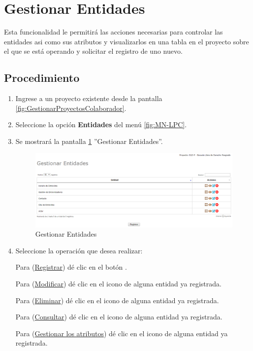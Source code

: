 \hypertarget{cv:gestionarEntidades}{\section{Gestionar Entidades}} \label{sec:GestionarEntidades}

	Esta funcionalidad le permitirá las acciones necesarias para controlar las entidades asi como sus atributos y visualizarlos en una tabla en el proyecto sobre el que se está operando y solicitar el registro de uno nuevo.

		\subsection{Procedimiento}

			\begin{enumerate}
				
			\item Ingrese a un proyecto existente desde la pantalla \ref{fig:GestionarProyectosColaborador}.
	
			\item Seleccione la opción \textbf{Entidades} del menú \ref{fig:MN-LPC}.
	
			\item Se mostrará la pantalla \ref{fig:GestionarEntidades} ''Gestionar Entidades''.

			\begin{figure}[h!]
				\begin{center}
					\includegraphics[scale=0.5]{roles/lider/entidades/pantallas/IU12gestionarEntidades}
					\caption{Gestionar Entidades}
					\label{fig:GestionarEntidades}
				\end{center}
			\end{figure}
		
				\item Seleccione la operación que desea realizar:
			
			Para (\hyperlink{cv:registrarEntidad}{Registrar}) dé clic en el botón \IURegistrar.
			
			Para (\hyperlink{cv:modificarEntidad}{Modificar}) dé clic en el icono \IUEditar{} de alguna entidad ya registrada.
			
			Para (\hyperlink{cv:eliminarEntidad}{Eliminar}) dé clic en el icono \IUBotonEliminar{} de alguna entidad ya registrada.
			
			Para (\hyperlink{cv:consultarEntidad}{Consultar}) dé clic en el icono \IUConsultar{} de alguna entidad ya registrada.
			
			Para (\hyperlink{cv:gestionarAtributos}{Gestionar los atributos}) dé clic en el icono \IUAtributos{} de alguna entidad ya registrada.
			\end{enumerate}